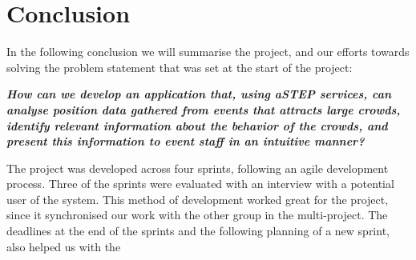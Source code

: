 \chapter{Conclusion}\label{ch:conclusion}


In the following conclusion we will summarise the project, and our efforts towards solving the problem statement that was set at the start of the project:

\vspace{0.5 cm}
\begin{center}
	\textbf{\textit{How can we develop an application that, using aSTEP services, can analyse position data gathered from events that attracts large crowds, identify relevant information about the behavior of the crowds, and present this information to event staff in an intuitive manner?}}
\end{center}

The project was developed across four sprints, following an agile development process. Three of the sprints were evaluated with an interview with a potential user of the system. This method of development worked great for the project, since it synchronised our work with the other group in the multi-project. The deadlines at the end of the sprints and the following planning of a new sprint, also helped us with the





